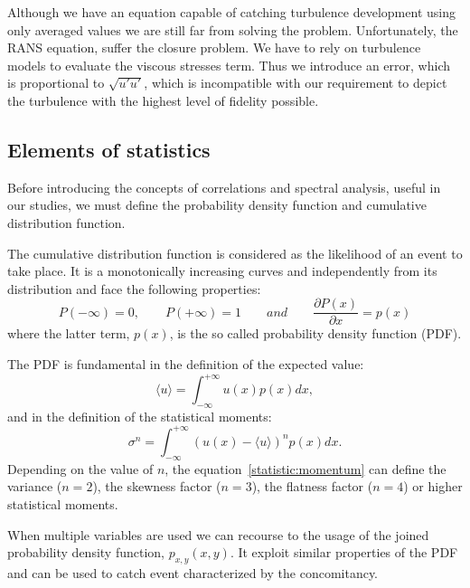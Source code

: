 \par
Although we have an equation capable of catching turbulence development using only averaged values we are still far from solving the problem. Unfortunately, the RANS equation, suffer the closure problem. We have to rely on turbulence models to evaluate the viscous stresses term. Thus we introduce an error, which is proportional to $\sqrt{u'u'}$, which is incompatible with our requirement to depict the turbulence with the highest level of fidelity possible.





\subsection{Elements of statistics}
Before introducing the concepts of correlations and spectral analysis, useful in our studies, we must define the probability density function and cumulative distribution function. \par
The cumulative distribution function is considered as the likelihood of an event to take place. It is a monotonically increasing curves and independently from its distribution and face the following properties:
\begin{equation*}
P(-\infty) = 0, \qquad P(+\infty) = 1 \qquad and \qquad \frac{\partial P(x)}{\partial x} = p(x)
\end{equation*}
where the latter term, $p(x)$, is the so called probability density function (PDF).
\par
The PDF is fundamental in the definition of the expected value:
\begin{equation}
\langle u \rangle = \int_{-\infty}^{+\infty} u(x) p(x) dx,
\end{equation}
and in the definition of the statistical moments:
\begin{equation}
\sigma^{n} = \int_{-\infty}^{+\infty} (u(x) - \langle u \rangle)^{n} p(x)dx.
\label{statistic:momentum}
\end{equation}
Depending on the value of $n$, the equation~\ref{statistic:momentum} can define the variance ($n=2$), the skewness factor ($n=3$), the flatness factor ($n=4$) or higher statistical moments.
\par
When multiple variables are used we can recourse to the usage of the joined probability density function, $p_{x,y}(x,y)$. It exploit similar properties of the PDF and can be used to catch event characterized by the concomitancy. 
\par
